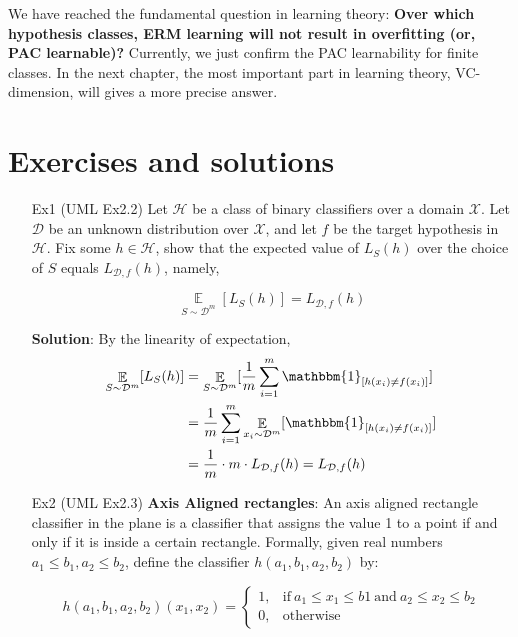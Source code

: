 \documentclass{article}
\begin{document}
	We have reached the fundamental question in learning theory: \textbf{Over which hypothesis classes, ERM learning will not result in overfitting (or, PAC learnable)?} Currently, we just confirm the PAC learnability for finite classes. In the next chapter, the most important part in learning theory, VC-dimension, will gives a more precise answer.


\section{Exercises and solutions}

\begin{itemize}
\item[Ex1] (UML Ex2.2) Let $\mathcal{H}$ be a class of binary classifiers over a domain $\mathcal{X}$. Let $\mathcal{D}$ be an unknown distribution over $\mathcal{X}$, and let $f$ be the target hypothesis in $\mathcal{H}$. Fix some $h\in\mathcal{H}$, show that the expected value of $L_S(h)$ over the choice of $S$ equals $L_{\mathcal{D},f}(h)$, namely,

\begin{equation*}
\mathop\mathbb{E}\limits_{S\sim\mathcal{D}^m}[L_S(h)]=L_{\mathcal{D},f}(h)
\end{equation*}

\item[] \textbf{Solution}: By the linearity of expectation,
\begin{equation*}
\begin{split}
\mathop\mathbb{E}\limits_{S\sim\mathcal{D}^m}[L_S(h)] 
&= \mathop\mathbb{E}\limits_{S\sim\mathcal{D}^m}[\frac{1}{m}\sum_{i=1}^m \mathbbm{1}_{[h(x_i)\neq f(x_i)]}] \\
&= \frac{1}{m}\sum_{i=1}^m \mathop\mathbb{E}\limits_{x_i \sim\mathcal{D}^m}[\mathbbm{1}_{[h(x_i)\neq f(x_i)]}] \\
&= \frac{1}{m} \cdot m \cdot L_{\mathcal{D},f}(h) = L_{\mathcal{D},f}(h)
\end{split}
\end{equation*}

\item[Ex2] (UML Ex2.3) \textbf{Axis Aligned rectangles}: An axis aligned rectangle classifier in the plane is a classifier that assigns the value 1 to a point if and only if it is inside a certain rectangle. Formally, given real numbers $a_1\leq b_1,a_2\leq b_2$, define the classifier $h(a_1,b_1,a_2,b_2)$ by:

	\begin{equation*}
	h(a_1,b_1,a_2,b_2)(x_1, x_2) = \left\{\begin{matrix}
	1,& \mathrm{if}\ a_1 \leq x_1 \leq b1\ \mathrm{and}\  a_2 \leq x_2 \leq b_2 \\
	0,& \mathrm{otherwise}
	\end{matrix}\right.
	\end{equation*}


\end{itemize}
\end{document}
